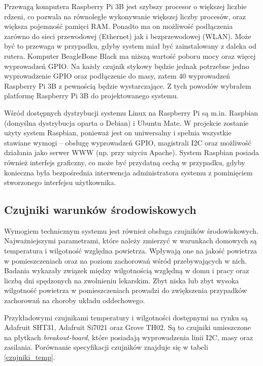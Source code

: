 \documentclass[a4paper,12pt,twoside]{article}
\begin{document}
Przewagą komputera Raspberry Pi 3B jest szybszy procesor o większej liczbie rdzeni, co pozwala na równoległe wykonywanie większej liczby procesów, oraz większa pojemność pamięci RAM. Ponadto ma on możliwość podłączenia zarówno do sieci przewodowej (Ethernet) jak i bezprzewodowej (WLAN). Może być to przewaga w przypadku, gdyby system miał być zainstalowany z daleka od rutera. Komputer BeagleBone Black ma niższą wartość poboru mocy oraz więcej wyprowadzeń GPIO. Na każdy czujnik stykowy będzie jednak potrzebne jedno wyprowadzenie GPIO oraz podłączenie do masy, zatem 40 wyprowadzeń Raspberry Pi 3B z pewnością będzie wystarczające. Z tych powodów wybrałem platformę Raspberry Pi 3B do projektowanego systemu.

Wśród dostępnych dystrybucji systemu Linux na Raspberry Pi są m.in. Raspbian (domyślna dystrybucja oparta o Debian) i Ubuntu Mate. W projekcie zostanie użyty system Raspbian, ponieważ jest on uniwersalny i spełnia wszystkie stawiane wymogi -- obsługę wyprowadzeń GPIO, magistrali I2C oraz możliwość działania jako serwer WWW (np. przy użyciu Apache). System Raspbian posiada również interfejs graficzny, co może być przydatną cechą w przypadku, gdyby konieczna była bezpośrednia interwencja administratora systemu z pominięciem stworzonego interfejsu użytkownika.

\subsection{Czujniki warunków środowiskowych}
Wymogiem technicznym systemu jest również obsługa czujników środowiskowych. Najważniejszymi parametrami, które należy zmierzyć w warunkach domowych są temperatura i wilgotność względna powietrza. Wpływają one na jakość powietrza w pomieszczeniach oraz na poziom zachorowań wśród przebywających w nich. Badania wykazały związek między wilgotnością względną w domu i pracy oraz liczbą dni spędzonych na zwolnieniu lekarskim. Zbyt niska lub zbyt wysoka wilgotność powietrza w pomieszczeniach prowadzi do zwiększenia przypadków zachorowań na choroby układu oddechowego. \cite{zachorowania} 

Przykładowymi czujnikami temperatury i wilgotności dostępnymi na rynku są Adafruit SHT31, Adafruit Si7021 oraz Grove TH02. Są to czujniki umieszczone na płytkach \textit{breakout-board}, które posiadają wyprowadzenia linii I2C, masy oraz zasilania. Porównanie specyfikacji czujników znajduje się w tabeli \ref{czujniki_temp}.
\end{document}
